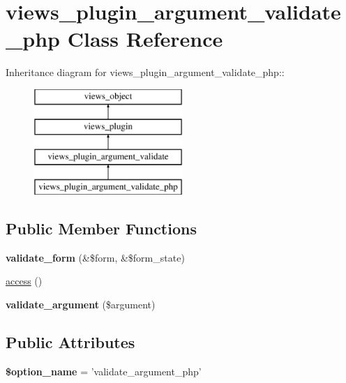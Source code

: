 \hypertarget{classviews__plugin__argument__validate__php}{
\section{views\_\-plugin\_\-argument\_\-validate\_\-php Class Reference}
\label{classviews__plugin__argument__validate__php}
}
Inheritance diagram for views\_\-plugin\_\-argument\_\-validate\_\-php::\begin{figure}[H]
\begin{center}
\leavevmode
\includegraphics[height=4cm]{classviews__plugin__argument__validate__php}
\end{center}
\end{figure}
\subsection*{Public Member Functions}
\begin{CompactItemize}
\item 
\hypertarget{classviews__plugin__argument__validate__php_c06281cb98d54a76618a85198d424818}{
\textbf{validate\_\-form} (\&\$form, \&\$form\_\-state)}
\label{classviews__plugin__argument__validate__php_c06281cb98d54a76618a85198d424818}

\item 
\hyperlink{classviews__plugin__argument__validate__php_11100ee9f3e1d9ec27f3f1b151994d1c}{access} ()
\item 
\hypertarget{classviews__plugin__argument__validate__php_0edabb29fabfd718ca1000eb158ef580}{
\textbf{validate\_\-argument} (\$argument)}
\label{classviews__plugin__argument__validate__php_0edabb29fabfd718ca1000eb158ef580}

\end{CompactItemize}
\subsection*{Public Attributes}
\begin{CompactItemize}
\item 
\hypertarget{classviews__plugin__argument__validate__php_0ab51fee7b5e5331a07047cfbca122a5}{
\textbf{\$option\_\-name} = 'validate\_\-argument\_\-php'}
\label{classviews__plugin__argument__validate__php_0ab51fee7b5e5331a07047cfbca122a5}

\end{CompactItemize}


